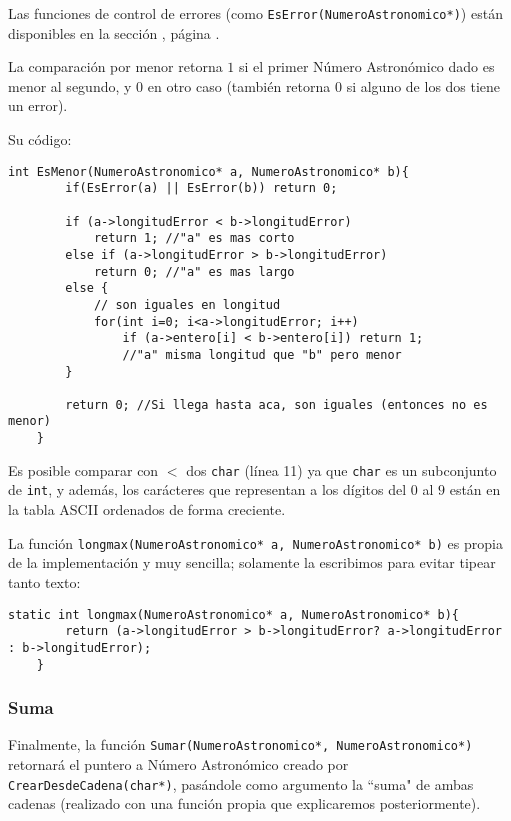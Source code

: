 \documentclass[a4paper, 12pt]{article}
\begin{document}
Las funciones de control de errores (como \verb|EsError(NumeroAstronomico*)|) están disponibles en la sección , página \pageref{errores}.

La comparación por menor retorna $1$ si el primer Número Astronómico dado es menor al segundo, y $0$ en otro caso (también retorna $0$ si alguno de los dos tiene un error).

Su código:

\begin{lstlisting}[style=C]
    int EsMenor(NumeroAstronomico* a, NumeroAstronomico* b){
        if(EsError(a) || EsError(b)) return 0;
        
        if (a->longitudError < b->longitudError)
            return 1; //"a" es mas corto
        else if (a->longitudError > b->longitudError)
            return 0; //"a" es mas largo
        else {
            // son iguales en longitud
            for(int i=0; i<a->longitudError; i++)
                if (a->entero[i] < b->entero[i]) return 1;
                //"a" misma longitud que "b" pero menor
        }
        
        return 0; //Si llega hasta aca, son iguales (entonces no es menor)
    }
\end{lstlisting}

Es posible comparar con $<$ dos \verb|char| (línea 11) ya que \verb|char| es un subconjunto de \verb|int|, y además, los carácteres que representan a los dígitos del $0$ al $9$ están en la tabla ASCII ordenados de forma creciente.

La función \verb|longmax(NumeroAstronomico* a, NumeroAstronomico* b)| es propia de la implementación y muy sencilla; solamente la escribimos para evitar tipear tanto texto:

\begin{lstlisting}[style=C]
    static int longmax(NumeroAstronomico* a, NumeroAstronomico* b){
        return (a->longitudError > b->longitudError? a->longitudError : b->longitudError);
    }
\end{lstlisting}

\subsubsection{Suma}\label{aritmetica-suma}

Finalmente, la función \verb|Sumar(NumeroAstronomico*, NumeroAstronomico*)| retornará el puntero a Número Astronómico creado por \verb|CrearDesdeCadena(char*)|, pasándole como argumento la ``suma" de ambas cadenas (realizado con una función propia que explicaremos posteriormente).
\end{document}
